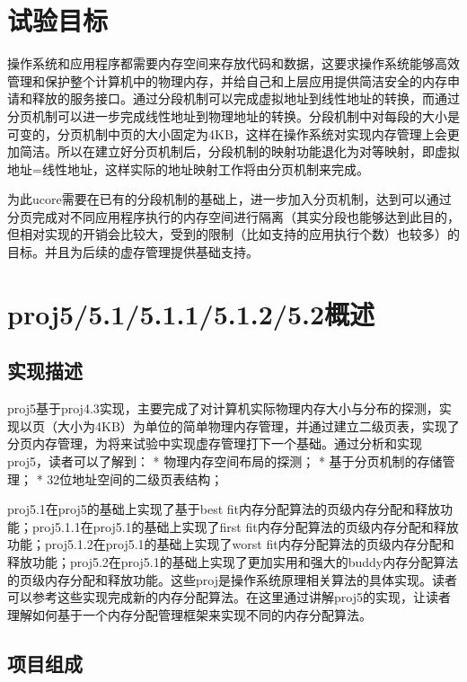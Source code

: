 \section{试验目标}\label{ux8bd5ux9a8cux76eeux6807}

操作系统和应用程序都需要内存空间来存放代码和数据，这要求操作系统能够高效管理和保护整个计算机中的物理内存，并给自己和上层应用提供简洁安全的内存申请和释放的服务接口。通过分段机制可以完成虚拟地址到线性地址的转换，而通过分页机制可以进一步完成线性地址到物理地址的转换。分段机制中对每段的大小是可变的，分页机制中页的大小固定为4KB，这样在操作系统对实现内存管理上会更加简洁。所以在建立好分页机制后，分段机制的映射功能退化为对等映射，即虚拟地址=线性地址，这样实际的地址映射工作将由分页机制来完成。

为此ucore需要在已有的分段机制的基础上，进一步加入分页机制，达到可以通过分页完成对不同应用程序执行的内存空间进行隔离（其实分段也能够达到此目的，但相对实现的开销会比较大，受到的限制（比如支持的应用执行个数）也较多）的目标。并且为后续的虚存管理提供基础支持。

\section{proj5/5.1/5.1.1/5.1.2/5.2概述}\label{proj55.15.1.15.1.25.2ux6982ux8ff0}

\subsection{实现描述}\label{ux5b9eux73b0ux63cfux8ff0}

proj5基于proj4.3实现，主要完成了对计算机实际物理内存大小与分布的探测，实现以页（大小为4KB）为单位的简单物理内存管理，并通过建立二级页表，实现了分页内存管理，为将来试验中实现虚存管理打下一个基础。通过分析和实现proj5，读者可以了解到：
* 物理内存空间布局的探测； * 基于分页机制的存储管理； *
32位地址空间的二级页表结构；

proj5.1在proj5的基础上实现了基于best
fit内存分配算法的页级内存分配和释放功能；proj5.1.1在proj5.1的基础上实现了first
fit内存分配算法的页级内存分配和释放功能；proj5.1.2在proj5.1的基础上实现了worst
fit内存分配算法的页级内存分配和释放功能；proj5.2在proj5.1的基础上实现了更加实用和强大的buddy内存分配算法的页级内存分配和释放功能。这些proj是操作系统原理相关算法的具体实现。读者可以参考这些实现完成新的内存分配算法。在这里通过讲解proj5的实现，让读者理解如何基于一个内存分配管理框架来实现不同的内存分配算法。

\subsection{项目组成}\label{ux9879ux76eeux7ec4ux6210}

